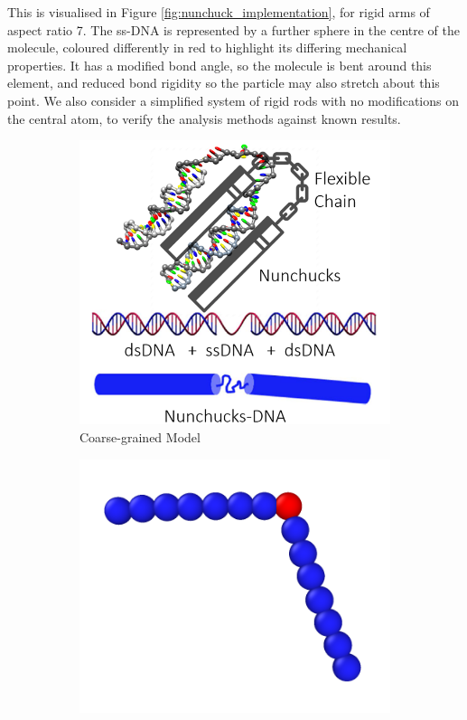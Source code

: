 \documentclass[11pt, a4paper]{article} %
\begin{document}
This is visualised in Figure \ref{fig:nunchuck_implementation}, for rigid arms of aspect ratio 7. The ss-DNA is represented by a further sphere in the centre of the molecule, coloured differently in red to highlight its differing mechanical properties. It has a modified bond angle, so the molecule is bent around this element, and reduced bond rigidity so the particle may also stretch about this point. We also consider a simplified system of rigid rods with no modifications on the central atom, to verify the analysis methods against known results.

\begin{figure}[ht]
	\hfill  %
	\begin{subfigure}{.4\textwidth}
		\centering
		\includegraphics[width=\linewidth]{Figures/nunchucks_artist}  
		\caption{Coarse-grained Model}
		\label{fig:nunchuck_analogy}
	\end{subfigure}
	\hfill %
	\begin{subfigure}{.4\textwidth}
		\centering
		\includegraphics[width=\linewidth]{Figures/nunchuck_profile_coloured}  

\end{subfigure}
\end{figure}
\end{document}
